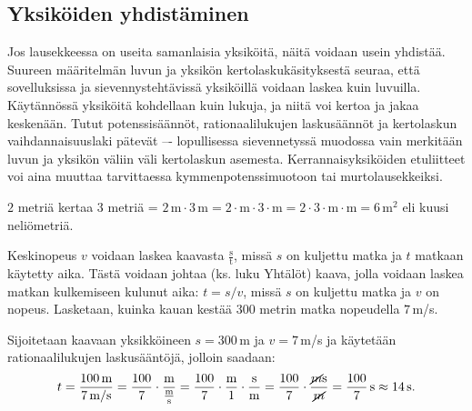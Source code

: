 
\subsection*{Yksiköiden yhdistäminen}

Jos lausekkeessa on useita samanlaisia yksiköitä, näitä voidaan usein yhdistää. Suureen määritelmän luvun ja yksikön kertolaskukäsityksestä seuraa, että sovelluksissa ja sievennystehtävissä yksiköillä voidaan laskea kuin luvuilla. Käytännössä yksiköitä kohdellaan kuin lukuja, ja niitä voi kertoa ja jakaa keskenään. Tutut potenssisäännöt, rationaalilukujen laskusäännöt ja kertolaskun vaihdannaisuuslaki pätevät –- lopullisessa sievennetyssä muodossa vain merkitään luvun ja yksikön väliin väli kertolaskun asemesta. Kerrannaisyksiköiden etuliitteet voi aina muuttaa tarvittaessa kymmenpotenssimuotoon tai murtolausekkeiksi.

\begin{esimerkki}
$2$ metriä kertaa $3$ metriä = $2\,\text{m} \cdot 3\,\text{m} = 2 \cdot \text{m} \cdot 3 \cdot \text{m}= 2 \cdot 3 \cdot \text{m} \cdot \text{m} =6\,\text{m}^2$ eli kuusi neliömetriä.
\end{esimerkki}

%
%
%	
%

%
%
%	


\begin{esimerkki}
Keskinopeus $v$ voidaan laskea kaavasta $\frac{\text{s}}{\text{t}}$, missä $s$ on kuljettu matka ja $t$ matkaan käytetty aika. Tästä voidaan johtaa (ks. luku Yhtälöt) kaava, jolla voidaan laskea matkan kulkemiseen kulunut aika: $t=s/v$, missä $s$ on kuljettu matka ja $v$ on nopeus. Lasketaan, kuinka kauan kestää $300$ metrin matka nopeudella $7$\,m/s.

Sijoitetaan kaavaan yksikköineen $s=300$\,m ja $v= 7$\,m/s ja käytetään rationaalilukujen laskusääntöjä, jolloin saadaan:
\[t=\frac{100\,\textrm{m}}{7\,\textrm{m/s}} = \frac{100}{7} \cdot \frac{\textrm{m}}{\frac{\textrm{m}}{\textrm{s}}} 
= \frac{100}{7} \cdot \frac{\textrm{m}}{1} \cdot \frac{\textrm{s}}{\textrm{m}}
= \frac{100}{7} \cdot \frac{\cancel{m}\textrm{s}}{\cancel{m}}
=\frac{100}{7}\,\textrm{s} \approx 14\,\textrm{s}.\]
\end{esimerkki}

